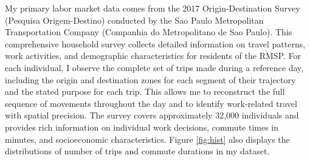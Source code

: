 My primary labor market data comes from the 2017 Origin-Destination Survey (Pesquisa Origem-Destino) conducted by the Sao Paulo Metropolitan Transportation Company (Companhia do Metropolitano de Sao Paulo). This comprehensive household survey collects detailed information on travel patterns, work activities, and demographic characteristics for residents of the RMSP. For each individual, I observe the complete set of trips made during a reference day, including the origin and destination zones for each segment of their trajectory and the stated purpose for each trip. This allows me to reconstruct the full sequence of movements throughout the day and to identify work-related travel with spatial precision. The survey covers approximately 32,000 individuals and provides rich information on individual work decisions, commute times in minutes, and socioeconomic characteristics. Figure \ref{fig:hist} also displays the distributions of number of trips and commute durations in my dataset.

